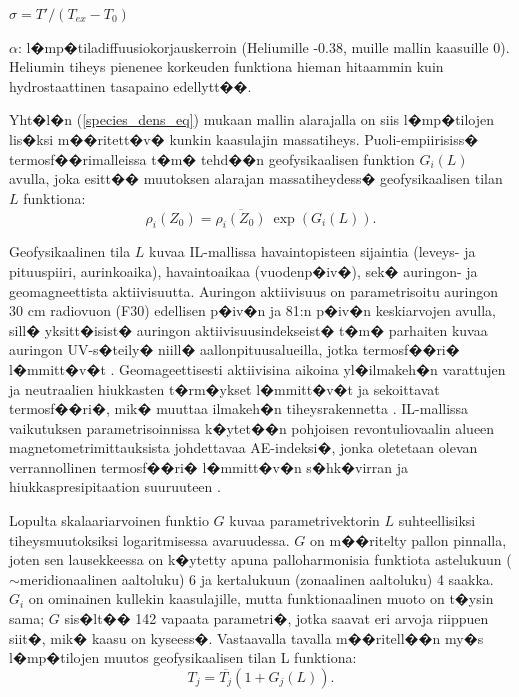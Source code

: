 \documentclass[12pt,a4paper,finnish,margin=2in]{article}
\begin{document}
$\sigma = T' / (T_{ex} - T_0)$

$\alpha$: l�mp�tiladiffuusiokorjauskerroin (Heliumille -0.38, muille mallin kaasuille 0). Heliumin tiheys pienenee korkeuden funktiona hieman hitaammin kuin hydrostaattinen tasapaino edellytt��.

Yht�l�n (\ref{species_dens_eq}) mukaan mallin alarajalla on siis l�mp�tilojen lis�ksi m��ritett�v� kunkin kaasulajin massatiheys. Puoli-empiirisiss� termosf��rimalleissa t�m� tehd��n geofysikaalisen funktion $G_i(L)$ avulla, joka esitt�� muutoksen alarajan massatiheydess� geofysikaalisen tilan $L$ funktiona:
\begin{equation} \label{lb_eq}
\rho_i(Z_0) = \overline{\rho_i(Z_0)}~\exp(G_i(L)).
\end{equation}

Geofysikaalinen tila $L$ kuvaa IL-mallissa havaintopisteen sijaintia (leveys- ja pituuspiiri, aurinkoaika), havaintoaikaa (vuodenp�iv�), sek� auringon- ja geomagneettista aktiivisuutta. Auringon aktiivisuus on parametrisoitu auringon 30 cm radiovuon (F30) edellisen p�iv�n ja 81:n p�iv�n keskiarvojen avulla, sill� yksitt�isist� auringon aktiivisuusindekseist� t�m� parhaiten kuvaa auringon UV-s�teily� niill� aallonpituusalueilla, jotka termosf��ri� l�mmitt�v�t \citep{bruinsma_2017}. Geomageettisesti aktiivisina aikoina yl�ilmakeh�n varattujen ja neutraalien hiukkasten t�rm�ykset l�mmitt�v�t ja sekoittavat termosf��ri�, mik� muuttaa ilmakeh�n tiheysrakennetta \citep[esim.][]{prolss_2011}. IL-mallissa vaikutuksen parametrisoinnissa k�ytet��n pohjoisen revontuliovaalin alueen magnetometrimittauksista johdettavaa AE-indeksi�, jonka oletetaan olevan verrannollinen termosf��ri� l�mmitt�v�n s�hk�virran ja hiukkaspresipitaation suuruuteen \citep{iipponen_2015}.

Lopulta skalaariarvoinen funktio $G$ kuvaa parametrivektorin $L$ suhteellisiksi tiheysmuutoksiksi logaritmisessa avaruudessa. $G$ on m��ritelty pallon pinnalla, joten sen lausekkeessa on k�ytetty apuna palloharmonisia funktiota astelukuun ($\sim$meridionaalinen aaltoluku) 6 ja kertalukuun (zonaalinen aaltoluku) 4 saakka. $G_i$ on ominainen kullekin kaasulajille, mutta funktionaalinen muoto on t�ysin sama; $G$ sis�lt�� 142 vapaata parametri�, jotka saavat eri arvoja riippuen siit�, mik� kaasu on kyseess�. Vastaavalla tavalla m��ritell��n my�s l�mp�tilojen muutos geofysikaalisen tilan L funktiona:
\begin{equation} \label{lb_eq}
T_j = \overline{T_j} (1 + G_j(L)).
\end{equation}
\end{document}
